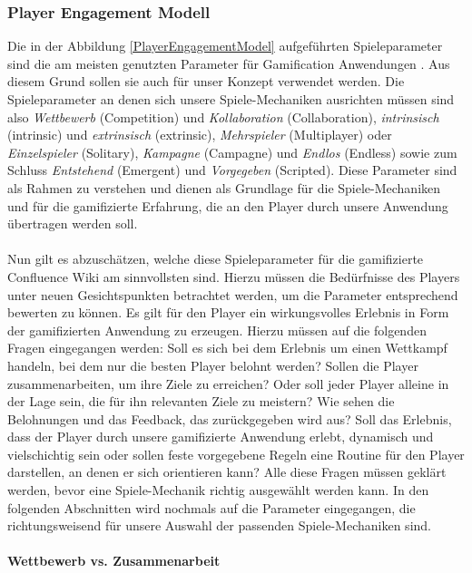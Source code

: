 \documentclass[a4paper,12pt,twoside]{scrartcl}
\begin{document}
\subsubsection{Player Engagement Modell}
\label{Player Engagement Modell}
Die in der Abbildung \ref{PlayerEngagementModel} aufgeführten Spieleparameter sind die am meisten genutzten Parameter für Gamification Anwendungen \cite{gamificationDefinition}. Aus diesem Grund sollen sie auch für unser Konzept verwendet werden. Die Spieleparameter an denen sich unsere Spiele-Mechaniken ausrichten müssen sind also \textit{Wettbewerb} (Competition) und \textit{Kollaboration} (Collaboration), \textit{intrinsisch} (intrinsic) und \textit{extrinsisch} (extrinsic), \textit{Mehrspieler} (Multiplayer) oder \textit{Einzelspieler} (Solitary), \textit{Kampagne} (Campagne) und \textit{Endlos} (Endless) sowie zum Schluss \textit{Entstehend} (Emergent) und \textit{Vorgegeben} (Scripted). Diese Parameter sind als Rahmen zu verstehen und dienen als Grundlage für die Spiele-Mechaniken und für die gamifizierte Erfahrung, die an den Player durch unsere Anwendung übertragen werden soll. 
\\\\
Nun gilt es abzuschätzen, welche diese Spieleparameter für die gamifizierte Confluence Wiki am sinnvollsten sind. Hierzu müssen die Bedürfnisse des Players unter neuen Gesichtspunkten betrachtet werden, um die Parameter entsprechend bewerten zu können. Es gilt für den Player ein wirkungsvolles Erlebnis in Form der gamifizierten Anwendung zu erzeugen. Hierzu müssen auf die folgenden Fragen eingegangen werden: Soll es sich bei dem Erlebnis um einen Wettkampf handeln, bei dem nur die besten Player belohnt werden? Sollen die Player zusammenarbeiten, um ihre Ziele zu erreichen? Oder soll jeder Player alleine in der Lage sein, die für ihn relevanten Ziele zu meistern? Wie sehen die Belohnungen und das Feedback, das zurückgegeben wird aus? Soll das Erlebnis, dass der Player durch unsere gamifizierte Anwendung erlebt, dynamisch und vielschichtig sein oder sollen feste vorgegebene Regeln eine Routine für den Player darstellen, an denen er sich orientieren kann? Alle diese Fragen müssen geklärt werden, bevor eine Spiele-Mechanik richtig ausgewählt werden kann. In den folgenden Abschnitten wird nochmals auf die Parameter eingegangen, die richtungsweisend für unsere Auswahl der passenden Spiele-Mechaniken sind.
\\\\
\textbf{Wettbewerb vs. Zusammenarbeit}\\
\end{document}
